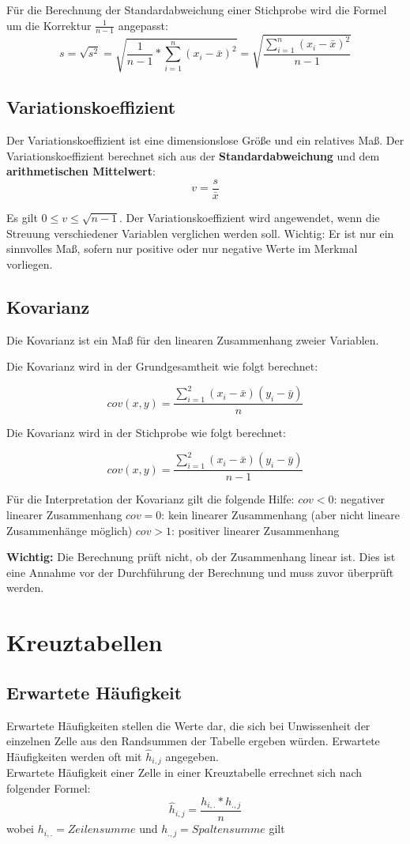 \documentclass[11pt,a4paper]{article}
\begin{document}
Für die Berechnung der Standardabweichung einer Stichprobe wird die Formel um die Korrektur $\frac{1}{n-1}$ angepasst: \\
$$s = \sqrt{s^2} = \sqrt{\frac{1}{n-1} *{\sum_{i=1}^n (x_i - \bar{x})^2}} = \sqrt{\frac{\sum_{i=1}^n (x_i - \bar{x})^2}{n-1}}$$

\subsection{Variationskoeffizient}
Der Variationskoeffizient ist eine dimensionslose Größe und ein relatives Maß. Der Variationskoeffizient berechnet sich aus der \textbf{Standardabweichung} und dem \textbf{arithmetischen Mittelwert}:\\
$$v=\frac{s}{\bar{x}}$$

Es gilt $0 \leq v \leq \sqrt{n-1}$. Der Variationskoeffizient wird angewendet, wenn die Streuung verschiedener Variablen verglichen werden soll. Wichtig: Er ist nur ein sinnvolles Maß, sofern nur positive oder nur negative Werte im Merkmal vorliegen.

\subsection{Kovarianz}
Die Kovarianz ist ein Maß für den linearen Zusammenhang zweier Variablen. 

Die Kovarianz wird in der Grundgesamtheit wie folgt berechnet:

$$cov(x, y) = \frac{\sum_{i=1}^2 (x_i - \bar{x})(y_i-\bar{y})}{n}$$

Die Kovarianz wird in der Stichprobe wie folgt berechnet:

$$cov(x, y) = \frac{\sum_{i=1}^2 (x_i - \bar{x})(y_i-\bar{y})}{n - 1}$$

Für die Interpretation der Kovarianz gilt die folgende Hilfe:
$cov < 0$: negativer linearer Zusammenhang
$cov = 0$: kein linearer Zusammenhang (aber nicht lineare Zusammenhänge möglich)
$cov > 1$: positiver linearer Zusammenhang

\textbf{Wichtig:} Die Berechnung prüft nicht, ob der Zusammenhang linear ist. Dies ist eine Annahme vor der Durchführung der Berechnung und muss zuvor überprüft werden.

\section{Kreuztabellen}
\subsection{Erwartete Häufigkeit}
Erwartete Häufigkeiten stellen die Werte dar, die sich bei Unwissenheit der einzelnen Zelle aus den Randsummen der Tabelle ergeben würden. Erwartete Häufigkeiten werden oft mit $\hat{h}_{i, j}$ angegeben.\\
Erwartete Häufigkeit einer Zelle in einer Kreuztabelle errechnet sich nach folgender Formel: \\
$$\hat{h}_{i, j}=\frac{h_{i,.} \ast h_{.,j}}{n}$$ 
wobei $h_{i,.}=Zeilensumme$ und $h_{.,j}=Spaltensumme$ gilt\\
\end{document}

